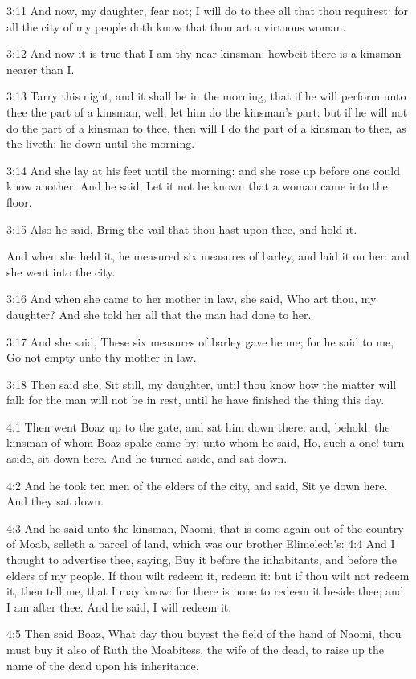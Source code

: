 3:11 And now, my daughter, fear not; I will do to thee all that thou requirest: for all the city of my people doth know that thou art a virtuous woman.

3:12 And now it is true that I am thy near kinsman: howbeit there is a kinsman nearer than I.

3:13 Tarry this night, and it shall be in the morning, that if he will perform unto thee the part of a kinsman, well; let him do the kinsman's part: but if he will not do the part of a kinsman to thee, then will I do the part of a kinsman to thee, as the \LORD liveth: lie down until the morning.

3:14 And she lay at his feet until the morning: and she rose up before one could know another. And he said, Let it not be known that a woman came into the floor.

3:15 Also he said, Bring the vail that thou hast upon thee, and hold it.

And when she held it, he measured six measures of barley, and laid it on her: and she went into the city.

3:16 And when she came to her mother in law, she said, Who art thou, my daughter? And she told her all that the man had done to her.

3:17 And she said, These six measures of barley gave he me; for he said to me, Go not empty unto thy mother in law.

3:18 Then said she, Sit still, my daughter, until thou know how the matter will fall: for the man will not be in rest, until he have finished the thing this day.

4:1 Then went Boaz up to the gate, and sat him down there: and, behold, the kinsman of whom Boaz spake came by; unto whom he said, Ho, such a one! turn aside, sit down here. And he turned aside, and sat down.

4:2 And he took ten men of the elders of the city, and said, Sit ye down here. And they sat down.

4:3 And he said unto the kinsman, Naomi, that is come again out of the country of Moab, selleth a parcel of land, which was our brother Elimelech's: 4:4 And I thought to advertise thee, saying, Buy it before the inhabitants, and before the elders of my people. If thou wilt redeem it, redeem it: but if thou wilt not redeem it, then tell me, that I may know: for there is none to redeem it beside thee; and I am after thee. And he said, I will redeem it.

4:5 Then said Boaz, What day thou buyest the field of the hand of Naomi, thou must buy it also of Ruth the Moabitess, the wife of the dead, to raise up the name of the dead upon his inheritance.

